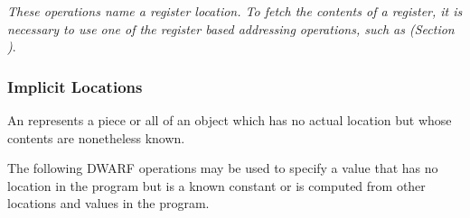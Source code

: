 \textit{These operations name a register location. To
fetch the contents of a register, it is necessary to use
one of the register based addressing operations, such as
\DWOPbregx{}
(Section )}.

\subsubsection{Implicit Locations}
\label{chap:implicitlocations}
An  represents a piece or all
 of an object which has no actual
location but whose contents are nonetheless known.

The following DWARF operations may be used to specify a value that has
no location in the program but is a known constant or is computed from
other locations and values in the program.
